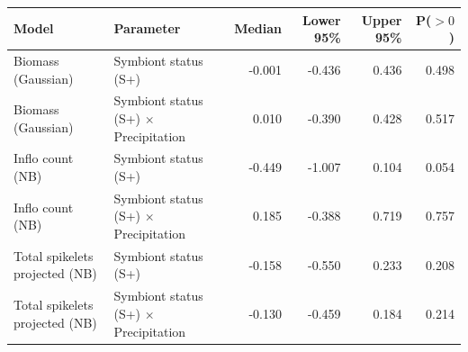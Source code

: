 \begin{tabular}{llrrrr}
\hline
Model & Parameter & Median & Lower 95\% & Upper 95\% & P($>0$) \\ 
\hline
Biomass (Gaussian) & Symbiont status (S+) & -0.001 & -0.436 & 0.436 & 0.498 \\ 
Biomass (Gaussian) & Symbiont status (S+) $\times$ Precipitation & 0.010 & -0.390 & 0.428 & 0.517 \\ 

Inflo count (NB) & Symbiont status (S+) & -0.449 & -1.007 & 0.104 & 0.054 \\ 
Inflo count (NB) & Symbiont status (S+) $\times$ Precipitation & 0.185 & -0.388 & 0.719 & 0.757 \\ 

Total spikelets projected (NB) & Symbiont status (S+) & -0.158 & -0.550 & 0.233 & 0.208 \\ 
Total spikelets projected (NB) & Symbiont status (S+) $\times$ Precipitation & -0.130 & -0.459 & 0.184 & 0.214 \\ 


\hline
\end{tabular}
